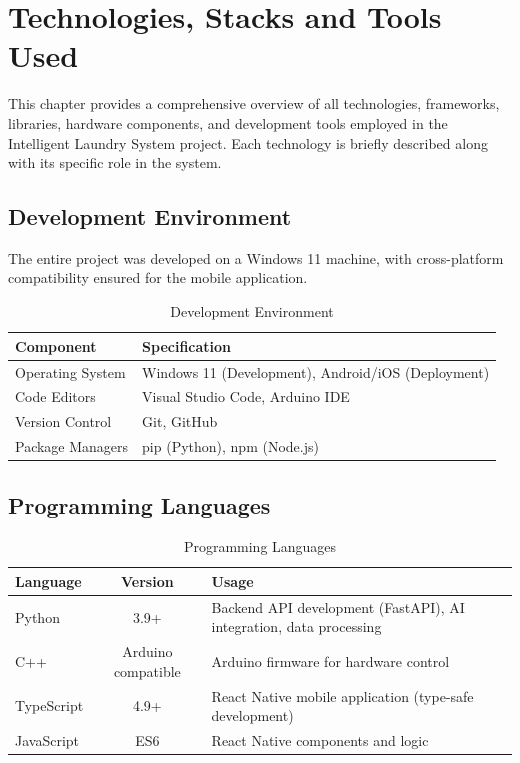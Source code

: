\chapter{Technologies, Stacks and Tools Used}
This chapter provides a comprehensive overview of all technologies, frameworks, libraries, hardware components, and development tools employed in the Intelligent Laundry System project. Each technology is briefly described along with its specific role in the system.


\section{Development Environment}
The entire project was developed on a Windows 11 machine, with cross-platform compatibility ensured for the mobile application.

\begin{table}[H]
    \centering
    \begin{tabular}{|l|l|}
        \hline
        \textbf{Component} & \textbf{Specification} \\
        \hline
        Operating System & Windows 11 (Development), Android/iOS (Deployment) \\
        \hline
        Code Editors & Visual Studio Code, Arduino IDE \\
        \hline
        Version Control & Git, GitHub \\
        \hline
        Package Managers & pip (Python), npm (Node.js) \\
        \hline
    \end{tabular}
    \caption{Development Environment}
    \label{tab:dev_env}
\end{table}

\section{Programming Languages}
\begin{table}[H]
    \centering
    \small
    \begin{tabularx}{\textwidth}{|l|c|X|}
        \hline
        \textbf{Language} & \textbf{Version} & \textbf{Usage} \\
        \hline
        Python & 3.9+ & Backend API development (FastAPI), AI integration, data processing \\
        \hline
        C++ & Arduino compatible & Arduino firmware for hardware control \\
        \hline
        TypeScript & 4.9+ & React Native mobile application (type-safe development) \\
        \hline
        JavaScript & ES6 & React Native components and logic \\
        \hline
    \end{tabularx}
    \caption{Programming Languages}
    \label{tab:langs}
\end{table}

